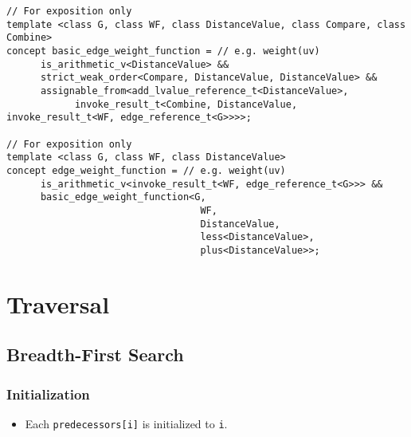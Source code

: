\begin{lstlisting}
// For exposition only
template <class G, class WF, class DistanceValue, class Compare, class Combine>
concept basic_edge_weight_function = // e.g. weight(uv)
      is_arithmetic_v<DistanceValue> && 
      strict_weak_order<Compare, DistanceValue, DistanceValue> &&
      assignable_from<add_lvalue_reference_t<DistanceValue>,
            invoke_result_t<Combine, DistanceValue, invoke_result_t<WF, edge_reference_t<G>>>>;

// For exposition only
template <class G, class WF, class DistanceValue>
concept edge_weight_function = // e.g. weight(uv)
      is_arithmetic_v<invoke_result_t<WF, edge_reference_t<G>>> &&
      basic_edge_weight_function<G,
                                  WF,
                                  DistanceValue,
                                  less<DistanceValue>,
                                  plus<DistanceValue>>;
\end{lstlisting}

\begin{comment}
      \phil{Queueable isn't being used.}
      \begin{lstlisting}
      // queueableQ can represent std::queue and std::priority\_queue
      template <class Q>
      concept queueable = requires(Q&& q, Q::value_type value) {
      Q::value_type;
      Q::size_type;
      Q::reference;

      {q.top()};
      {q.push(value)};
      {q.pop()};
      {q.empty()};
      {q.size()};
      };
      \end{lstlisting}
\end{comment}



\section{Traversal}

\subsection{Breadth-First Search}

\subsubsection{Initialization}

{\small
      
}

\begin{itemdescr}
      \effects
      \begin{itemize}
            \item
                  Each \lstinline{predecessors[i]} is initialized to \lstinline{i}.
      \end{itemize}
\end{itemdescr}


